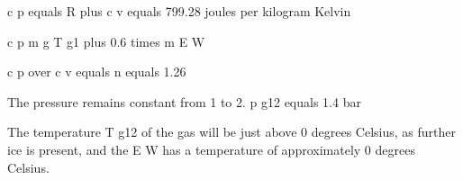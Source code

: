 c p equals R plus c v equals 799.28 joules per kilogram Kelvin

c p m g T g1 plus 0.6 times m E W

c p over c v equals n equals 1.26

The pressure remains constant from 1 to 2. p g12 equals 1.4 bar

The temperature T g12 of the gas will be just above 0 degrees Celsius, as further ice is present, and the E W has a temperature of approximately 0 degrees Celsius.